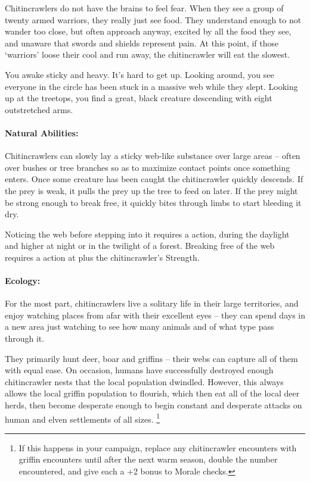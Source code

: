 \begin{multicols}{2}
Chitincrawlers do not have the brains to feel fear.
When they see a group of twenty armed warriors, they really just see food.
They understand enough to not wander too close, but often approach anyway, excited by all the food they see, and unaware that swords and shields represent pain.
At this point, if those `warriors' loose their cool and run away, the chitincrawler will eat the slowest.

\chitincrawler

\begin{boxtext}

You awake sticky and heavy.
It's hard to get up.
Looking around, you see everyone in the circle has been stuck in a massive web while they slept.
Looking up at the treetops, you find a great, black creature descending with eight outstretched arms.

\end{boxtext}

\paragraph{Natural Abilities:} Chitincrawlers can slowly lay a sticky web-like substance over large areas -- often over bushes or tree branches so as to maximize contact points once something enters.
Once some creature has been caught the chitincrawler quickly descends.
If the prey is weak, it pulls the prey up the tree to feed on later.
If the prey might be strong enough to break free, it quickly bites through limbs to start bleeding it dry.

Noticing the web before stepping into it requires a  action, \tn[7] during the daylight and higher at night or in the twilight of a forest.
Breaking free of the web requires a  action at \tn[7] plus the chitincrawler's Strength.

\paragraph{Ecology:}
For the most part, chitincrawlers live a solitary life in their large territories, and enjoy watching places from afar with their excellent eyes -- they can spend days in a new area just watching to see how many animals and of what type pass through it.

They primarily hunt deer, boar and griffins -- their webs can capture all of them with equal ease.
On occasion, humans have successfully destroyed enough chitincrawler nests that the local population dwindled.
However, this always allows the local griffin population to flourish, which then eat all of the local deer herds, then become desperate enough to begin constant and desperate attacks on human and elven settlements of all sizes.%
\footnote{If this happens in your campaign, replace any chitincrawler encounters with griffin encounters until after the next warm season, double the number encountered, and give each a +2 bonus to Morale checks.}


\end{multicols}
